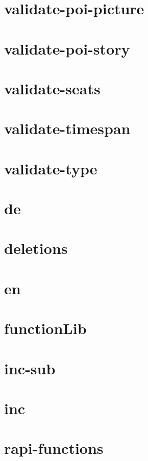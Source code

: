 \section{validate-poi-picture}

\newpage
\section{validate-poi-story}

\newpage
\section{validate-seats}

\newpage
\section{validate-timespan}

\newpage
\section{validate-type}

\newpage
\section{de}

\newpage
\section{deletions}

\newpage
\section{en}

\newpage
\section{functionLib}

\newpage
\section{inc-sub}

\newpage
\section{inc}

\newpage
\section{rapi-functions}

\newpage
